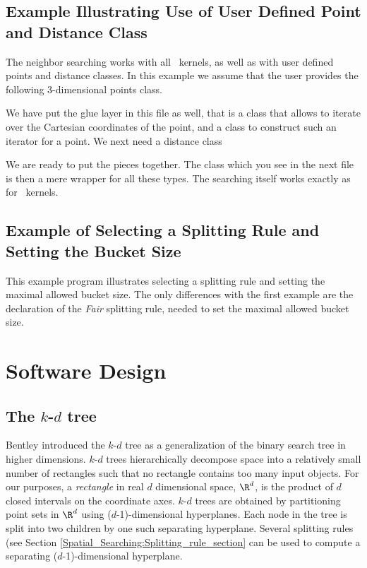 \newpage
\subsection{Example Illustrating Use of User Defined Point and Distance Class}

The neighbor searching works with all \cgal\ kernels, as well as with
user defined points and distance classes.
In this example we assume that the user provides the following 3-dimensional 
points class.


We have put the glue layer in this file as well, that is a class that allows to 
iterate over the Cartesian coordinates of the point, and a class to construct
such an iterator for a point. We next need a distance class
\newpage
{}

\newpage

We are ready to put the pieces together.
The class  which you see in the next file is then a mere 
wrapper for all these types.  The searching itself works exactly as for \cgal\ kernels.


\newpage
\subsection{Example of Selecting a Splitting Rule and Setting the Bucket Size}

This example program illustrates selecting a splitting rule and
setting the maximal allowed bucket size.  The only differences with
the first example are the declaration of the {\em Fair} 
splitting rule, needed to set the maximal allowed bucket size.


\newpage

\section{Software Design}

\subsection{The $k$-$d$ tree\label{Kd_tree_subsection}}

Bentley \cite{b-mbstu-75} introduced the $k$-$d$ tree as a
generalization of the binary search tree in higher dimensions. $k$-$d$
trees hierarchically decompose space into a relatively small number of
rectangles such that no rectangle contains too many input objects.
For our purposes, a {\it rectangle} in real $d$ dimensional space,
$\R^d$, is the product of $d$ closed intervals on the coordinate axes.
$k$-$d$ trees are obtained by partitioning point sets in $\R^d$ using
($d$-1)-dimensional hyperplanes.  Each node in the tree is split into
two children by one such separating hyperplane.  Several splitting
rules (see Section \ref{Spatial_Searching:Splitting_rule_section} can
be used to compute a separating ($d$-1)-dimensional hyperplane.

